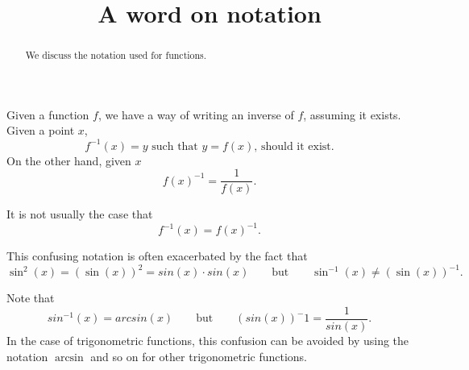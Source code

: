 \documentclass{ximera}
\title{A word on notation}
\begin{document}
\begin{abstract}
  We discuss the notation used for functions.
\end{abstract}
\maketitle

Given a function $f$, we have a way of writing an inverse of $f$,
assuming it exists. Given a point $x$, 
\[
f^{-1}(x) = \text{$y$ such that $y = f(x)$, should it exist.}
\]
On the other hand, given $x$
\[
f(x)^{-1} = \frac{1}{f(x)}.
\]
\begin{warning}
It is not usually the case that 
\[
f^{-1}(x) = f(x)^{-1}.
\]
\end{warning}

This confusing notation is often exacerbated by the fact that 
\[
\sin^2(x) = (\sin(x))^2=sin(x)\cdot sin(x)\qquad \text{but} \qquad \sin^{-1}(x)
\ne(\sin(x))^{-1}.
\]

\begin{warning}
  Note that 
  \[
  sin^{-1}(x)=arcsin(x)\qquad\text{but}\qquad (sin(x))^-1 = \frac
  {1}{sin(x)}.
  \]
  In the case of trigonometric functions, this confusion can be avoided
  by using the notation $\arcsin$ and so on for other trigonometric
  functions.
\end{warning}
\end{document}
